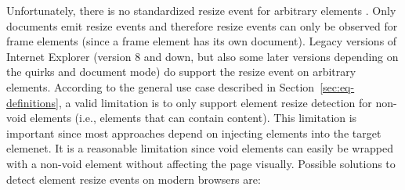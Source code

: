 \documentclass[a4paper,11pt]{kth-mag}
\begin{document}
        Unfortunately, there is no standardized resize event for arbitrary \glspl{element} \cite{w3c_dom2_events}.
        Only \glspl{document} emit resize events and therefore resize events can only be observed for frame \glspl{element} (since a frame \gls{element} has its own \gls{document}).
        Legacy versions of Internet Explorer (version 8 and down, but also some later versions depending on the quirks and \gls{document} mode) do support the resize event on arbitrary \glspl{element}.
        According to the general use case described in Section~\ref{sec:eq-definitions}, a valid limitation is to only support \gls{element} resize detection for non-void \glspl{element} (i.e., \glspl{element} that can contain content).
        This limitation is important since most approaches depend on injecting \glspl{element} into the target elemenet.
        It is a reasonable limitation since void \glspl{element} can easily be wrapped with a non-void element without affecting the page visually.
        Possible solutions to detect element resize events on modern \glspl{browser} are:
\end{document}
